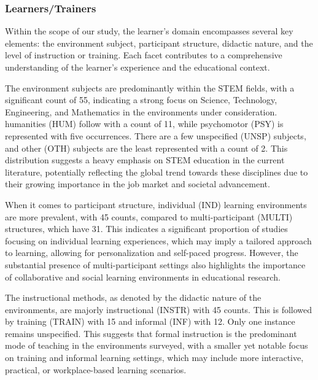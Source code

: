 \documentclass[manuscript,screen,review]{acmart}
\begin{document}
\subsubsection{Learners/Trainers}
Within the scope of our study, the learner's domain encompasses several key elements: the environment subject, participant structure, didactic nature, and the level of instruction or training. Each facet contributes to a comprehensive understanding of the learner's experience and the educational context.

The environment subjects are predominantly within the STEM fields, with a significant count of 55, indicating a strong focus on Science, Technology, Engineering, and Mathematics in the environments under consideration. humanities (HUM) follow with a count of 11, while psychomotor (PSY) is represented with five occurrences. There are a few unspecified (UNSP) subjects, and other (OTH) subjects are the least represented with a count of 2. This distribution suggests a heavy emphasis on STEM education in the current literature, potentially reflecting the global trend towards these disciplines due to their growing importance in the job market and societal advancement.

When it comes to participant structure, individual (IND) learning environments are more prevalent, with 45 counts, compared to multi-participant (MULTI) structures, which have 31. This indicates a significant proportion of studies focusing on individual learning experiences, which may imply a tailored approach to learning, allowing for personalization and self-paced progress. However, the substantial presence of multi-participant settings also highlights the importance of collaborative and social learning environments in educational research.

The instructional methods, as denoted by the didactic nature of the environments, are majorly instructional (INSTR) with 45 counts. This is followed by training (TRAIN) with 15 and informal (INF) with 12. Only one instance remains unspecified. This suggests that formal instruction is the predominant mode of teaching in the environments surveyed, with a smaller yet notable focus on training and informal learning settings, which may include more interactive, practical, or workplace-based learning scenarios.
\end{document}
